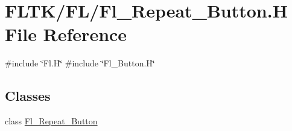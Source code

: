 \hypertarget{_fl___repeat___button_8_h}{}\section{F\+L\+T\+K/\+F\+L/\+Fl\+\_\+\+Repeat\+\_\+\+Button.H File Reference}
\label{_fl___repeat___button_8_h}
{\ttfamily \#include \char`\"{}Fl.\+H\char`\"{}}\newline
{\ttfamily \#include \char`\"{}Fl\+\_\+\+Button.\+H\char`\"{}}\newline
\subsection*{Classes}
\begin{DoxyCompactItemize}
\item 
class \hyperlink{class_fl___repeat___button}{Fl\+\_\+\+Repeat\+\_\+\+Button}
\end{DoxyCompactItemize}

